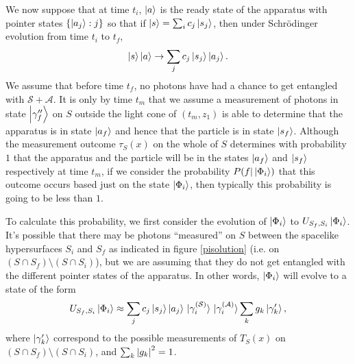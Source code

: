  We now suppose that at time $t_i$, $\ket{a}$ is the ready state of the apparatus with pointer states $\{\ket{a_j}:j\}$ so that if $\ket{s}=\sum_i c_j\ket{s_j}$, then under Schr\"{o}dinger evolution from time $t_i$ to $t_f$,
 $$\ket{s}\ket{a}\rightarrow\sum_j c_j\ket{s_j}\ket{a_j}.$$
 We assume that before time $t_f$, no photons have had a chance to get entangled with $\mathcal{S}+\mathcal{A}$. It is only by time $t_m$ that we assume a measurement of photons in state $\ket{\gamma_f^{\prime\prime}}$ on $S$ outside the light cone of $(t_m,z_1)$ is able to determine that the apparatus is in state $\ket{a_f}$ and hence that the particle is in state $\ket{s_f}$. Although the measurement outcome $\tau_S(x)$ on the whole of $S$ determines with probability $1$ that the apparatus and the particle will be in the states $\ket{a_f}$ and $\ket{s_f}$ respectively at time $t_m$, if we consider the probability $P(f|\ket{\Phi_i})$ that this outcome occurs based just on the state $\ket{\Phi_i}$, then typically this probability is going to be less than $1$.
 
 To calculate this probability, we first consider the evolution of $\ket{\Phi_i}$ to $ U_{S_f,S_i}\ket{\Phi_{i}}$. It's possible that there may be photons ``measured'' on $S$ between the spacelike hypersurfaces $S_i$ and $S_f$ as indicated in figure \ref{pisolution} (i.e. on $(S\cap S_f)\setminus(S\cap S_i)$), but we are assuming that they do not get entangled with the different pointer states of the apparatus. In other words, $\ket{\Phi_i}$ will evolve to a state of the form 
\begin{equation}\label{USfievolve1}
	U_{S_f,S_i}\ket{\Phi_{i}}\approx \sum_j c_j\ket{s_j}\ket{a_j}\ket*{\gamma_i^{(\mathcal{S})}}\ket*{\gamma_i^{(\mathcal{A})}}\sum_kg_k\ket{\gamma'_k},
\end{equation}
where $\ket{\gamma_k'}$ correspond to the possible measurements of $T_S(x)$  on $(S\cap S_f)\setminus(S\cap S_i)$, and $\sum_k\abs{g_k}^2=1$.


